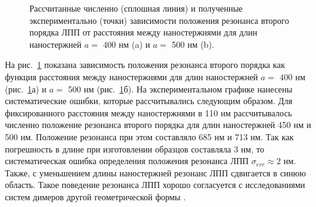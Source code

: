 \begin{figure}
\caption{Рассчитанные численно (сплошная линия) и полученные экспериментально (точки) зависимости положения резонанса второго порядка ЛПП от расстояния между наностержнями для длин наностержней $ a = $ 400 нм (a) и $ a = $ 500 нм (b).}
\label{img:2res}
\end{figure}
На рис.~\ref{img:2res} показана зависимость положения резонанса второго порядка как функция расстояния между наностержнями для длин наностержней $ a = $ 400 нм (рис.~\ref{img:2res}а) и $ a = $ 500 нм (рис.~\ref{img:2res}б). На экспериментальном графике нанесены систематические ошибки, которые рассчитывались следующим образом. Для фиксированного расстояния между наностержнями в 110 нм рассчитывалось численно положение резонанса второго порядка для длин наностержней 450 нм и 500 нм. Положение резонанса при этом составляло 685 нм и 713 нм. Так как погрешность в длине при изготовлении образцов составляла 3 нм, то систематическая ошибка определения положения резонанса ЛПП  $ \sigma_{err} \approx 2 $ нм. Также, с уменьшением длины наностержней резонанс ЛПП сдвигается в синюю область. Такое поведение резонанса ЛПП хорошо согласуется с исследованиями систем димеров другой геометрической формы \cite{plasonrulereq, nanoprism}.
